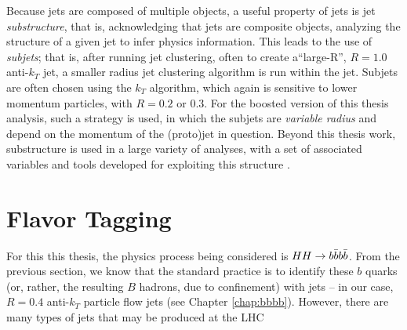 Because jets are composed of multiple objects, a useful property of jets is jet \emph{substructure}, that is, 
acknowledging that jets are composite objects, analyzing the structure of a given jet to infer physics information. 
This leads to the use of \emph{subjets}; that is, after running jet clustering, often to create a``large-R'', $R=1.0$ 
anti-$k_{T}$ jet, a smaller radius jet clustering algorithm is run within the jet. Subjets are often chosen using the 
$k_{T}$ algorithm, which again is sensitive to lower momentum particles, with $R=0.2$ or 0.3. For the boosted version 
of this thesis analysis, such a strategy is used, in which the subjets are \emph{variable radius} and depend on the 
momentum of the (proto)jet in question. Beyond this thesis work, substructure is used in a large variety of analyses, 
with a set of associated variables and tools developed for exploiting this structure .
 
\section{Flavor Tagging}
For this this thesis, the physics process being considered is $HH\rightarrow b\bar{b}b\bar{b}$. From the previous section, we 
know that the standard practice is to identify these $b$ quarks (or, rather, the resulting $B$ hadrons, due to confinement) with jets -- in our case, $R=0.4$ anti-$k_{T}$ particle flow jets (see Chapter \ref{chap:bbbb}). However, there are many 
types of jets that may be produced at the LHC




